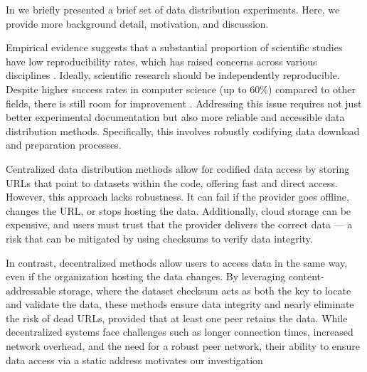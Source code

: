 


In  we briefly presented a brief set of data distribution experiments.
Here, we provide more background detail, motivation, and discussion.

Empirical evidence suggests that a substantial proportion of scientific studies have low reproducibility
  rates, which has raised concerns across various disciplines \cite{baker_reproducibility_2016}.
Ideally, scientific research should be independently reproducible.
Despite higher success rates in computer science (up to 60\%) compared to other fields, there is still room for improvement
\cite{NEURIPS2019_c429429b, collberg2016repeatability, desai_what_2024}.
Addressing this issue requires not just better experimental documentation but also more reliable and
  accessible data distribution methods.
Specifically, this involves robustly codifying data download and preparation processes.


Centralized data distribution methods allow for codified data access by storing URLs that point to datasets
  within the code, offering fast and direct access.
However, this approach lacks robustness.
It can fail if the provider goes offline, changes the URL, or stops hosting the data.
Additionally, cloud storage can be expensive, and users must trust that the provider delivers the correct
  data --- a risk that can be mitigated by using checksums to verify data integrity.

In contrast, decentralized methods allow users to access data in the same way, even if the organization
  hosting the data changes.
By leveraging content-addressable storage, where the dataset checksum acts as both the key to locate and
  validate the data, these methods ensure data integrity and nearly eliminate the risk of dead URLs, provided
  that at least one peer retains the data.
While decentralized systems face challenges such as longer connection times, increased network overhead, and
  the need for a robust peer network, their ability to ensure data access via a static address
  motivates our investigation

